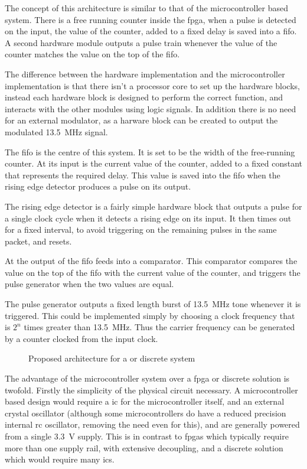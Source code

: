 The concept of this architecture is similar to that of the microcontroller based system. There is a free running counter inside the \gls{fpga}, when a pulse is detected on the input, the value of the counter, added to a fixed delay is saved into a \gls{fifo}. A second hardware module outputs a pulse train whenever the value of the counter matches the value on the top of the \gls{fifo}.

The difference between the hardware implementation and the microcontroller implementation is that there isn't a processor core to set up the hardware blocks, instead each hardware block is designed to perform the correct function, and interacts with the other modules using logic signals. In addition there is no need for an external modulator, as a harware block can be created to output the modulated \SI{13.5}{\mega\hertz} signal.

The \gls{fifo} is the centre of this system. It is set to be the width of the free-running counter. At its input is the current value of the counter, added to a fixed constant that represents the required delay. This value is saved into the \gls{fifo} when the rising edge detector produces a pulse on its output.

The rising edge detector is a fairly simple hardware block that outputs a pulse for a single clock cycle when it detects a rising edge on its input. It then times out for a fixed interval, to avoid triggering on the remaining pulses in the same packet, and resets.

At the output of the \gls{fifo} feeds into a comparator. This comparator compares the value on the top of the \gls{fifo} with the current value of the counter, and triggers the pulse generator when the two values are equal.

The pulse generator outputs a fixed length burst of \SI{13.5}{\mega\hertz} tone whenever it is triggered. This could be implemented simply by choosing a clock frequency that is $2^n$ times greater than \SI{13.5}{\mega\hertz}. Thus the carrier frequency can be generated by a counter clocked from the input clock.

\begin{figure}[ht]
	\centering
	\dummyfigure
	\caption{Proposed architecture for a  or discrete system}
	\label{fig:hardware-system-arch}
\end{figure}


The advantage of the microcontroller system over a \gls{fpga} or discrete solution is twofold. Firstly the simplicity of the physical circuit necessary. A microcontroller based design would require a \gls{ic} for the microcontroller itself, and an external crystal oscillator (although some microcontrollers do have a reduced precision internal \gls{rc} oscillator, removing the need even for this), and are generally powered from a single \SI{3.3}{\volt} supply. This is in contrast to \glspl{fpga} which typically require more than one supply rail, with extensive decoupling, and a discrete solution which would require many \glspl{ic}.

